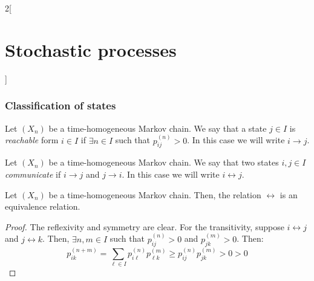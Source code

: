 \documentclass[../../../main_math.tex]{subfiles}
\begin{document}
\begin{multicols}{2}[\section{Stochastic processes}]
  \subsubsection{Classification of states}
  \begin{definition}
    Let $(X_n)$ be a time-homogeneous Markov chain. We say that a state $j\in I$ is \emph{reachable} form $i\in I$ if $\exists n\in I$ such that $p_{ij}^{(n)}>0$. In this case we will write $i\to j$.
  \end{definition}
  \begin{definition}
    Let $(X_n)$ be a time-homogeneous Markov chain. We say that two states $i,j\in I$ \emph{communicate} if $i\to j$ and $j\to i$. In this case we will write $i\leftrightarrow j$.
  \end{definition}
  \begin{lemma}
    Let $(X_n)$ be a time-homogeneous Markov chain. Then, the relation $\leftrightarrow$ is an equivalence relation.
  \end{lemma}
  \begin{proof}
    The reflexivity and symmetry are clear. For the transitivity, suppose $i\leftrightarrow j$ and $j\leftrightarrow k$. Then, $\exists n,m\in I$ such that $p_{ij}^{(n)}>0$ and $p_{jk}^{(m)}>0$. Then:
    $$p_{ik}^{(n+m)}=\sum_{\ell\in I} p_{i\ell}^{(n)}p_{\ell k}^{(m)}\geq p_{ij}^{(n)}p_{jk}^{(m)}>0>0$$
  \end{proof}
\end{multicols}
\end{document}
